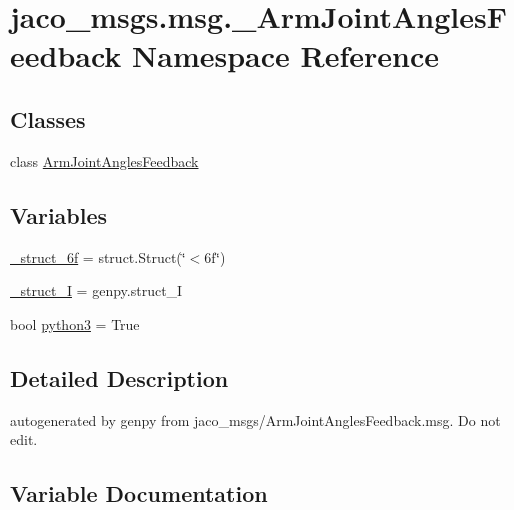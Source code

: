 \hypertarget{namespacejaco__msgs_1_1msg_1_1__ArmJointAnglesFeedback}{}\section{jaco\+\_\+msgs.\+msg.\+\_\+\+Arm\+Joint\+Angles\+Feedback Namespace Reference}
\label{namespacejaco__msgs_1_1msg_1_1__ArmJointAnglesFeedback}
\subsection*{Classes}
\begin{DoxyCompactItemize}
\item 
class \hyperlink{classjaco__msgs_1_1msg_1_1__ArmJointAnglesFeedback_1_1ArmJointAnglesFeedback}{Arm\+Joint\+Angles\+Feedback}
\end{DoxyCompactItemize}
\subsection*{Variables}
\begin{DoxyCompactItemize}
\item 
\hyperlink{namespacejaco__msgs_1_1msg_1_1__ArmJointAnglesFeedback_a6aa86fac24ef7b41d0fab379da7134e2}{\+\_\+struct\+\_\+6f} = struct.\+Struct(\char`\"{}$<$6f\char`\"{})
\item 
\hyperlink{namespacejaco__msgs_1_1msg_1_1__ArmJointAnglesFeedback_a67cd06604e38dba83e4565cef0404a4c}{\+\_\+struct\+\_\+I} = genpy.\+struct\+\_\+I
\item 
bool \hyperlink{namespacejaco__msgs_1_1msg_1_1__ArmJointAnglesFeedback_a759ed6b78decd6d86899f9ba756561e3}{python3} = True
\end{DoxyCompactItemize}


\subsection{Detailed Description}
\begin{DoxyVerb}autogenerated by genpy from jaco_msgs/ArmJointAnglesFeedback.msg. Do not edit.\end{DoxyVerb}
 

\subsection{Variable Documentation}
